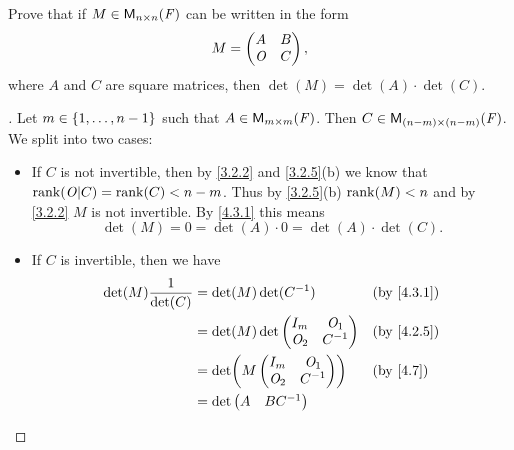 \begin{ex}\label{ex:4.3.21}
  Prove that if \(M \in \ms[n][n][\F]\) can be written in the form
  \[
    M = \begin{pmatrix}
      A   & B \\
      \mathit{O} & C
    \end{pmatrix},
  \]
  where \(A\) and \(C\) are square matrices, then \(\det(M) = \det(A) \cdot \det(C)\).
\end{ex}

\begin{proof}[]
  Let \(m \in \left\lbrace1, \dots, n - 1\right\rbrace\) such that \(A \in \ms[m][m][\F]\).
  Then \(C \in \ms[(n - m)][(n - m)][\F]\).
  We split into two cases:
  \begin{itemize}
    \item If \(C\) is not invertible, then by \cref{3.2.2} and \cref{3.2.5}(b) we know that \(\rk{\zm | C} = \rk{C} < n - m\).
          Thus by \cref{3.2.5}(b) \(\rk{M} < n\) and by \cref{3.2.2} \(M\) is not invertible.
          By \cref{4.3.1} this means
          \[
            \det(M) = 0 = \det(A) \cdot 0 = \det(A) \cdot \det(C).
          \]
    \item If \(C\) is invertible, then we have
          \begin{align*}
            \det(M) \dfrac{1}{\det(C)} & = \det(M) \det(C^{-1})        &  & \by{4.3.1}     \\
                                       & = \det(M) \det\begin{pmatrix}
                                                         I_m   & \zm_1  \\
                                                         \zm_2 & C^{-1}
                                                       \end{pmatrix} &  & \by{4.2.5}       \\
                                       & = \det\pa{M \begin{pmatrix}
                                                         I_m   & \zm_1  \\
                                                         \zm_2 & C^{-1}
                                                       \end{pmatrix}}   &  & \by{4.7}        \\
                                       & = \det\begin{pmatrix}
                                                 A   & BC^{-1} \\

\end{pmatrix}
\end{align*}
\end{itemize}
\end{proof}
